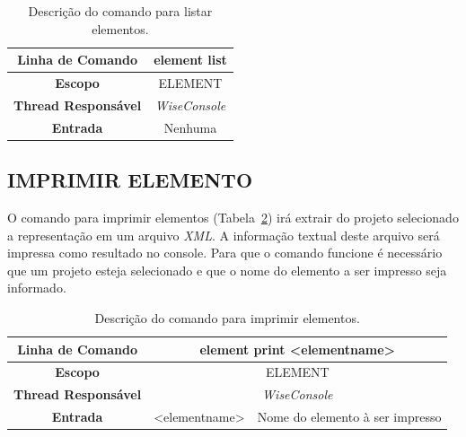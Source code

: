\begin{center}
	\begin{table}[!htbp]
		\begin{tabularx}{\textwidth}{c|X}
			\toprule
			\textbf{Linha de Comando} & \multicolumn{1}{c}{element list} \\
			\midrule
			\textbf{Escopo} & \multicolumn{1}{c}{ELEMENT} \\
			\hline
			\textbf{Thread Responsável} & \multicolumn{1}{c}{\textit{WiseConsole}} \\
			\hline
			\textbf{Entrada} & \multicolumn{1}{c}{Nenhuma} \\
			\bottomrule
		\end{tabularx}
		\caption{Descrição do comando para listar elementos.}
		\label{tab:list_element}
	\end{table}
\end{center}

\subsection{IMPRIMIR ELEMENTO}\label{sec:print_element}

O comando para imprimir elementos (Tabela~\ref{tab:print_element}) irá extrair do projeto selecionado a representação em um arquivo \textit{XML}. A informação textual deste arquivo será impressa como resultado no console. Para que o comando funcione é necessário que um projeto esteja selecionado e que o nome do elemento a ser impresso seja informado.

\begin{center}
	\begin{table}[!htbp]
		\begin{tabularx}{\textwidth}{c|c|X}
			\toprule
			\textbf{Linha de Comando} & \multicolumn{2}{c}{element print <element\underline{\space\space}name>} \\
			\midrule
			\textbf{Escopo} & \multicolumn{2}{c}{ELEMENT} \\
			\hline
			\textbf{Thread Responsável} & \multicolumn{2}{c}{\textit{WiseConsole}} \\
			\hline
			\textbf{Entrada} & <element\underline{\space\space}name> & Nome do elemento à ser impresso \\
			\bottomrule
		\end{tabularx}
		\caption{Descrição do comando para imprimir elementos.}
		\label{tab:print_element}
	\end{table}
\end{center}


